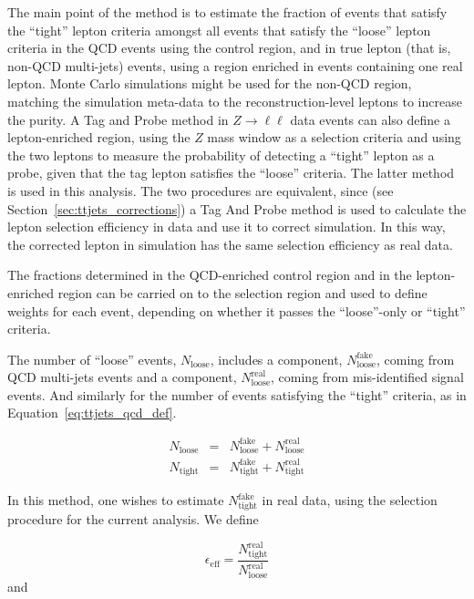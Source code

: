 The main point of the method is to estimate the fraction of events that satisfy the ``tight'' lepton criteria amongst all events
that satisfy the ``loose'' lepton criteria in the QCD events using the control region, and in true lepton (that is, non-QCD multi-jets) events,
using a region enriched in events containing one real lepton.
Monte Carlo simulations
might be used for the non-QCD region, matching the simulation meta-data to the reconstruction-level leptons to increase the purity.
A Tag and Probe method in $Z \rightarrow \ell \ell$ data events can also define a lepton-enriched region, using the $Z$ mass window as a selection criteria
and using the two leptons to measure the probability of detecting a ``tight'' lepton as a probe, given that the tag lepton satisfies the ``loose'' criteria. The latter
method is used in this analysis. The two procedures are equivalent, since (see Section~\ref{sec:ttjets_corrections}) a Tag And Probe method is used to calculate
the lepton selection efficiency in data and use it to correct simulation. In this way, the corrected lepton in simulation has the same selection efficiency as real data.

The fractions determined in the QCD-enriched control region and in the lepton-enriched region can be carried on to the \ttbar
selection region and used to define weights for each event, depending on whether
it passes the ``loose''-only or ``tight'' criteria.

The number of ``loose'' events, $N_{\mathrm{loose}}$, includes a component, $N^{\mathrm{fake}}_{\mathrm{loose}}$, coming from QCD multi-jets
events and a component, $N^{\mathrm{real}}_{\mathrm{loose}}$, coming from mis-identified signal events. And similarly for the number of events satisfying the ``tight''
criteria, as in Equation~\ref{eq:ttjets_qcd_def}.

\begin{eqnarray}
\displaystyle
N_{\mathrm{loose}}&=&N^{\mathrm{fake}}_{\mathrm{loose}} + N^{\mathrm{real}}_{\mathrm{loose}}\\
N_{\mathrm{tight}}&=&N^{\mathrm{fake}}_{\mathrm{tight}} + N^{\mathrm{real}}_{\mathrm{tight}}
\label{eq:ttjets_qcd_def}
\end{eqnarray}

In this method, one wishes to estimate $N^{\mathrm{fake}}_{\mathrm{tight}}$ in real data, using the selection procedure for the current
analysis.
We define

\begin{equation}
\displaystyle
\epsilon_{\mathrm{eff}} = \frac{N^{\mathrm{real}}_{\mathrm{tight}}}{N^{\mathrm{real}}_{\mathrm{loose}}}
\label{eq:ttjets_qcd_eff}
\end{equation}
 and

